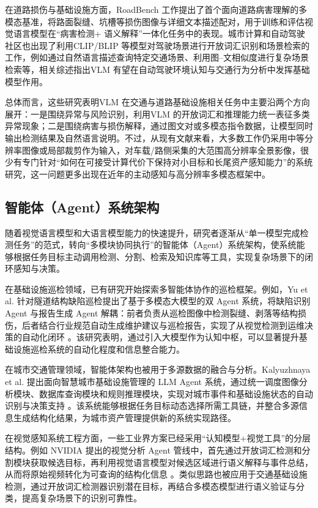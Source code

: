 在道路损伤与基础设施方面，RoadBench 工作提出了首个面向道路病害理解的多模态基准，将路面裂缝、坑槽等损伤图像与详细文本描述配对，用于训练和评估视觉语言模型在“病害检测+ 语义解释”一体化任务中的表现\cite{xiao2025roadbench}。城市计算和自动驾驶社区也出现了利用CLIP/BLIP 等模型对驾驶场景进行开放词汇识别和场景检索的工作，例如通过自然语言描述查询特定交通场景、利用图–文相似度进行复杂场景检索等\cite{jia2024bev}，相关综述指出VLM 有望在自动驾驶环境认知与交通行为分析中发挥基础模型作用\cite{zhou2024vision}。

总体而言，这些研究表明VLM 在交通与道路基础设施相关任务中主要沿两个方向展开：一是围绕异常与风险识别，利用VLM 的开放词汇和推理能力统一表征多类异常现象；二是围绕病害与损伤解释，通过图文对或多模态指令数据，让模型同时输出检测结果及自然语言说明。不过，从现有文献来看，大多数工作仍采用中等分辨率图像或局部裁剪作为输入，对车载/路侧采集的大范围高分辨率全景影像，很少有专门针对“如何在可接受计算代价下保持对小目标和长尾资产感知能力”的系统研究，这一问题更多出现在近年的主动感知与高分辨率多模态框架中。

\subsection{智能体（Agent）系统架构}
随着视觉语言模型和大语言模型能力的快速提升，研究者逐渐从“单一模型完成检测任务”的范式，转向“多模块协同执行”的智能体（Agent）系统架构，使系统能够根据任务目标主动调用检测、分割、检索及知识库等工具，实现复杂场景下的闭环感知与决策。

在基础设施巡检领域，已有研究开始探索多智能体协作的巡检框架。例如，Yu et al. 针对隧道结构缺陷巡检提出了基于多模态大模型的双 Agent 系统，将缺陷识别 Agent 与报告生成 Agent 解耦：前者负责从巡检图像中检测裂缝、剥落等结构损伤，后者结合行业规范自动生成维护建议与巡检报告，实现了从视觉检测到运维决策的自动化闭环 \cite{yu2026tunneldualagent}。该研究表明，通过引入大模型作为认知中枢，可以显著提升基础设施巡检系统的自动化程度和信息整合能力。

在城市交通管理领域，智能体架构也被用于多源数据的融合与分析。Kalyuzhnaya et al. 提出面向智慧城市基础设施管理的 LLM Agent 系统，通过统一调度图像分析模块、数据库查询模块和规则推理模块，实现对城市事件和基础设施状态的自动识别与决策支持 \cite{kalyuzhnaya2025smartcity}。该系统能够根据任务目标动态选择所需工具链，并整合多源信息生成结构化结果，为城市资产管理提供新的系统实现路径。

在视觉感知系统工程方面，一些工业界方案已经采用“认知模型+视觉工具”的分层结构。例如 NVIDIA 提出的视觉分析 Agent 管线中，首先通过开放词汇检测和分割模块获取候选目标，再利用视觉语言模型对候选区域进行语义解释与事件总结，从而将原始视频转化为可查询的结构化信息 \cite{nvidia2025videoagents}。类似思路也被应用于交通基础设施检测，通过开放词汇检测器识别潜在目标，再结合多模态模型进行语义验证与分类，提高复杂场景下的识别可靠性。

